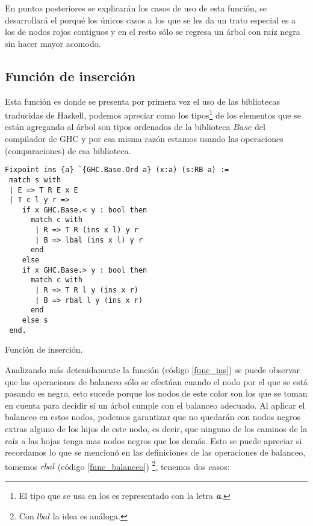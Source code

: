 En puntos posteriores se explicar\'an los casos de uso de esta función, se desarrollar\'a el 
porqu\'e los \'unicos casos a los que se les da un trato especial es a los de nodos rojos contiguos
y en el resto s\'olo se regresa un \'arbol con ra\'iz negra sin hacer mayor acomodo.

\subsection {Funci\'on de inserci\'on}
Esta funci\'on es donde se presenta por primera vez el uso de las bibliotecas traducidas de
Haskell, podemos apreciar como los tipos\footnote{El tipo que se usa en los {\arns} es representado 
con la letra \textbf{\textit{a}}.} de los elementos que se est\'an agregando al \'arbol son tipos
ordenados de la biblioteca $Base$ del compilador de GHC y por esa misma raz\'on estamos usando las
operaciones (comparaciones) de esa biblioteca.

\begin{listing}[!ht]
\centering
\captionsetup{justification=centering}
\begin{verbatim}
Fixpoint ins {a} `{GHC.Base.Ord a} (x:a) (s:RB a) :=
 match s with
 | E => T R E x E
 | T c l y r =>
    if x GHC.Base.< y : bool then
      match c with
       | R => T R (ins x l) y r
       | B => lbal (ins x l) y r
      end
    else
    if x GHC.Base.> y : bool then
      match c with
       | R => T R l y (ins x r)
       | B => rbal l y (ins x r)
      end
    else s
 end.
\end{verbatim}
\caption{Funci\'on de inserci\'on.}
\label{func_ins}
\end{listing}

Analizando m\'as detenidamente la funci\'on (c\'odigo \ref{func_ins}) se puede observar que las
operaciones de balanceo s\'olo se efectúan cuando el nodo por el que se est\'a pasando es negro, esto
sucede porque los nodos de este color son los que se toman en cuenta para decidir si
un \'arbol cumple con el balanceo adecuado. Al aplicar el balanceo en estos nodos, podemos 
garantizar que no quedar\'an con nodos negros extras alguno de los hijos de este nodo, es decir, que
ninguno de los caminos de la ra\'iz a las hojas tenga mas nodos negros que los demás. Esto se puede
apreciar si recordamos lo que se mencion\'o en las definiciones de las operaciones de balanceo, 
tomemos \hyperref[func_balanceo]{$rbal$} (c\'odigo \ref{func_balanceo})
\footnote{Con \hyperref[func_balanceo]{$lbal$} la idea es an\'aloga.}, tenemos dos casos:

